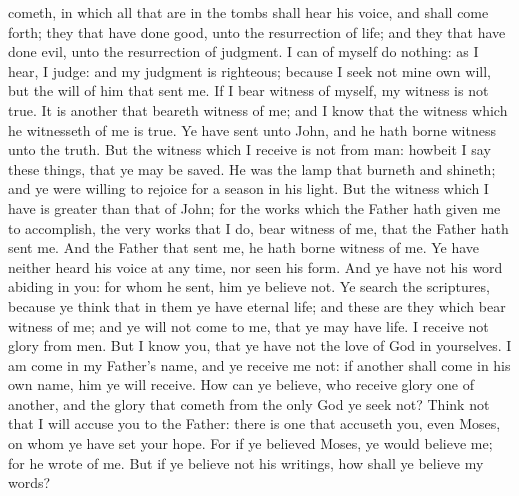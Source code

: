 cometh, in which all that are in the tombs shall hear his voice, and shall come forth; they that have done good, unto the resurrection of life; and they that have done evil, unto the resurrection of judgment.  I can of myself do nothing: as I hear, I judge: and my judgment is righteous; because I seek not mine own will, but the will of him that sent me. If I bear witness of myself, my witness is not true. It is another that beareth witness of me; and I know that the witness which he witnesseth of me is true. Ye have sent unto John, and he hath borne witness unto the truth. But the witness which I receive is not from man: howbeit I say these things, that ye may be saved. He was the lamp that burneth and shineth; and ye were willing to rejoice for a season in his light. But the witness which I have is greater than that of John; for the works which the Father hath given me to accomplish, the very works that I do, bear witness of me, that the Father hath sent me. And the Father that sent me, he hath borne witness of me. Ye have neither heard his voice at any time, nor seen his form. And ye have not his word abiding in you: for whom he sent, him ye believe not. Ye search the scriptures, because ye think that in them ye have eternal life; and these are they which bear witness of me; and ye will not come to me, that ye may have life. I receive not glory from men. But I know you, that ye have not the love of God in yourselves. I am come in my Father’s name, and ye receive me not: if another shall come in his own name, him ye will receive. How can ye believe, who receive glory one of another, and the glory that cometh from the only God ye seek not? Think not that I will accuse you to the Father: there is one that accuseth you, even Moses, on whom ye have set your hope. For if ye believed Moses, ye would believe me; for he wrote of me. But if ye believe not his writings, how shall ye believe my words? 



